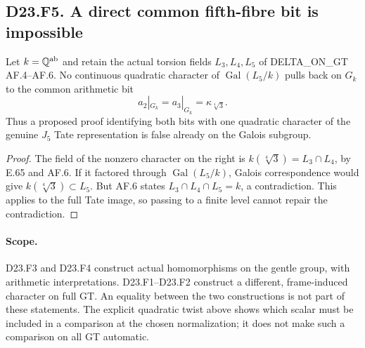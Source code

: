 \subsection*{D23.F5. A direct common fifth-fibre bit is impossible}
Let $k=\mathbb Q^{\rm ab}$ and retain the actual torsion fields
$L_3,L_4,L_5$ of DELTA\_ON\_GT AF.4--AF.6.  No continuous
quadratic character of $\operatorname{Gal}(L_5/k)$ pulls back
on $G_k$ to the common arithmetic bit
\[
 a_2|_{G_k}=a_3|_{G_k}
        =\kappa_{\sqrt[4]{3}}.
 \tag{D23.F5.1}
\]
Thus a proposed proof identifying both bits with one quadratic
character of the genuine $J_5$ Tate representation is false
already on the Galois subgroup.

\begin{proof}
The field of the nonzero character on the right is
$k(\sqrt[4]3)=L_3\cap L_4$, by E.65 and AF.6.
If it factored through $\operatorname{Gal}(L_5/k)$, Galois
correspondence would give $k(\sqrt[4]3)\subset L_5$.
But AF.6 states $L_3\cap L_4\cap L_5=k$, a contradiction.
This applies to the full Tate image, so passing to a finite
level cannot repair the contradiction.
\end{proof}

\paragraph{Scope.}
D23.F3 and D23.F4 construct actual homomorphisms on the gentle
group, with arithmetic interpretations.  D23.F1--D23.F2
construct a different, frame-induced character on full GT.
An equality between the two constructions is not part of
these statements.  The explicit quadratic twist above shows
which scalar must be included in a comparison at the chosen
normalization; it does not make such a comparison on all GT
automatic.
